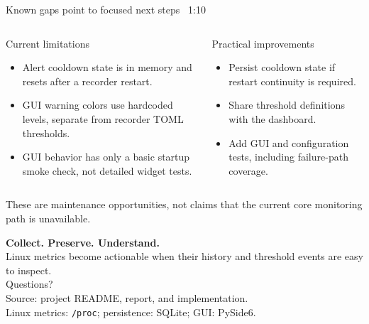 \documentclass[aspectratio=169,10pt]{beamer}
\newcommand{\slidepace}[1]{\hfill{\scriptsize\color{TBLMuted}#1}}
\begin{document}
\begin{frame}{Known gaps point to focused next steps}
\slidepace{~1:10}
\begin{columns}[T,onlytextwidth]
    \begin{block}{Current limitations}
      \begin{itemize}
        \item Alert cooldown state is in memory and resets after a recorder restart.
        \item GUI warning colors use hardcoded levels, separate from recorder TOML thresholds.
        \item GUI behavior has only a basic startup smoke check, not detailed widget tests.
      \end{itemize}
    \end{block}
    \begin{block}{Practical improvements}
      \begin{itemize}
        \item Persist cooldown state if restart continuity is required.
        \item Share threshold definitions with the dashboard.
        \item Add GUI and configuration tests, including failure-path coverage.
      \end{itemize}
    \end{block}
\end{columns}
\vspace{0.5em}
\centering\small\color{TBLMuted}These are maintenance opportunities, not claims that the current core monitoring path is unavailable.
\end{frame}

\begin{frame}[plain]
\vfill
\centering
{\Huge\color{TBLNavy}\textbf{Collect. Preserve. Understand.}}\\[0.7em]
{\large Linux metrics become actionable when their history and threshold events are easy to inspect.}\\[1.5em]
{\Large\color{TBLTeal}Questions?}\\[2em]
{\small\color{TBLMuted}Source: project README, report, and implementation. \\
Linux metrics: \texttt{/proc}; persistence: SQLite; GUI: PySide6.}
\vfill
\end{frame}
\end{document}
